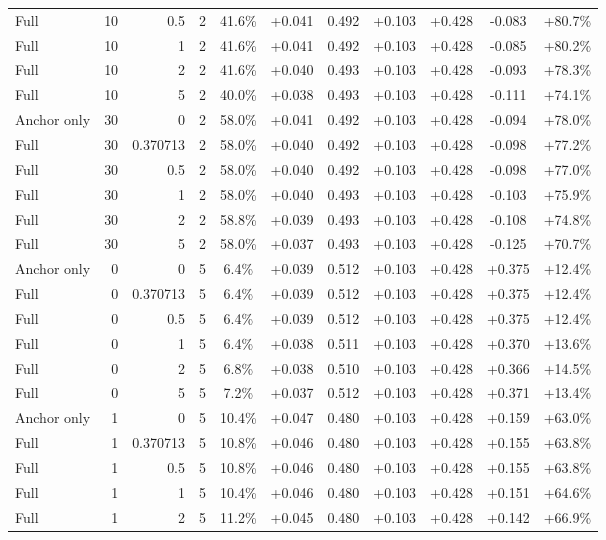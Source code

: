 \begin{table}[htbp]
\begin{tabular}{lrrrccccccc}
Full & 10 & 0.5 & 2 & 41.6\% & +0.041 & 0.492 & +0.103 & +0.428 & -0.083 & +80.7\% \\
Full & 10 & 1 & 2 & 41.6\% & +0.041 & 0.492 & +0.103 & +0.428 & -0.085 & +80.2\% \\
Full & 10 & 2 & 2 & 41.6\% & +0.040 & 0.493 & +0.103 & +0.428 & -0.093 & +78.3\% \\
Full & 10 & 5 & 2 & 40.0\% & +0.038 & 0.493 & +0.103 & +0.428 & -0.111 & +74.1\% \\
Anchor only & 30 & 0 & 2 & 58.0\% & +0.041 & 0.492 & +0.103 & +0.428 & -0.094 & +78.0\% \\
Full & 30 & 0.370713 & 2 & 58.0\% & +0.040 & 0.492 & +0.103 & +0.428 & -0.098 & +77.2\% \\
Full & 30 & 0.5 & 2 & 58.0\% & +0.040 & 0.492 & +0.103 & +0.428 & -0.098 & +77.0\% \\
Full & 30 & 1 & 2 & 58.0\% & +0.040 & 0.493 & +0.103 & +0.428 & -0.103 & +75.9\% \\
Full & 30 & 2 & 2 & 58.8\% & +0.039 & 0.493 & +0.103 & +0.428 & -0.108 & +74.8\% \\
Full & 30 & 5 & 2 & 58.0\% & +0.037 & 0.493 & +0.103 & +0.428 & -0.125 & +70.7\% \\
Anchor only & 0 & 0 & 5 & 6.4\% & +0.039 & 0.512 & +0.103 & +0.428 & +0.375 & +12.4\% \\
Full & 0 & 0.370713 & 5 & 6.4\% & +0.039 & 0.512 & +0.103 & +0.428 & +0.375 & +12.4\% \\
Full & 0 & 0.5 & 5 & 6.4\% & +0.039 & 0.512 & +0.103 & +0.428 & +0.375 & +12.4\% \\
Full & 0 & 1 & 5 & 6.4\% & +0.038 & 0.511 & +0.103 & +0.428 & +0.370 & +13.6\% \\
Full & 0 & 2 & 5 & 6.8\% & +0.038 & 0.510 & +0.103 & +0.428 & +0.366 & +14.5\% \\
Full & 0 & 5 & 5 & 7.2\% & +0.037 & 0.512 & +0.103 & +0.428 & +0.371 & +13.4\% \\
Anchor only & 1 & 0 & 5 & 10.4\% & +0.047 & 0.480 & +0.103 & +0.428 & +0.159 & +63.0\% \\
Full & 1 & 0.370713 & 5 & 10.8\% & +0.046 & 0.480 & +0.103 & +0.428 & +0.155 & +63.8\% \\
Full & 1 & 0.5 & 5 & 10.8\% & +0.046 & 0.480 & +0.103 & +0.428 & +0.155 & +63.8\% \\
Full & 1 & 1 & 5 & 10.4\% & +0.046 & 0.480 & +0.103 & +0.428 & +0.151 & +64.6\% \\
Full & 1 & 2 & 5 & 11.2\% & +0.045 & 0.480 & +0.103 & +0.428 & +0.142 & +66.9\% \\

\end{tabular}
\end{table}
